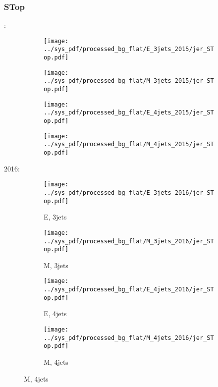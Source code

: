 \documentclass{beamer}
\begin{document}
\begin{frame}
\frametitle{STop}
\fontsize{5}{1}:
\begin{figure}
\centering
\begin{subfigure}[b]{0.24\textwidth}
\texttt{[image: ../sys\_pdf/processed\_bg\_flat/E\_3jets\_2015/jer\_STop.pdf]}
\end{subfigure}
\begin{subfigure}[b]{0.24\textwidth}
\texttt{[image: ../sys\_pdf/processed\_bg\_flat/M\_3jets\_2015/jer\_STop.pdf]}
\end{subfigure}
\begin{subfigure}[b]{0.24\textwidth}
\texttt{[image: ../sys\_pdf/processed\_bg\_flat/E\_4jets\_2015/jer\_STop.pdf]}
\end{subfigure}
\begin{subfigure}[b]{0.24\textwidth}
\texttt{[image: ../sys\_pdf/processed\_bg\_flat/M\_4jets\_2015/jer\_STop.pdf]}
\end{subfigure}
\end{figure}
2016:
\begin{figure}
\centering
\begin{subfigure}[b]{0.24\textwidth}
\texttt{[image: ../sys\_pdf/processed\_bg\_flat/E\_3jets\_2016/jer\_STop.pdf]}
\captionsetup{font=tiny}
\caption{E, 3jets}
\end{subfigure}
\begin{subfigure}[b]{0.24\textwidth}
\texttt{[image: ../sys\_pdf/processed\_bg\_flat/M\_3jets\_2016/jer\_STop.pdf]}
\captionsetup{font=tiny}
\caption{M, 3jets}
\end{subfigure}
\begin{subfigure}[b]{0.24\textwidth}
\texttt{[image: ../sys\_pdf/processed\_bg\_flat/E\_4jets\_2016/jer\_STop.pdf]}
\captionsetup{font=tiny}
\caption{E, 4jets}
\end{subfigure}
\begin{subfigure}[b]{0.24\textwidth}
\texttt{[image: ../sys\_pdf/processed\_bg\_flat/M\_4jets\_2016/jer\_STop.pdf]}
\captionsetup{font=tiny}
\caption{M, 4jets}
\end{subfigure}
\end{figure}
\end{frame}
\end{document}
